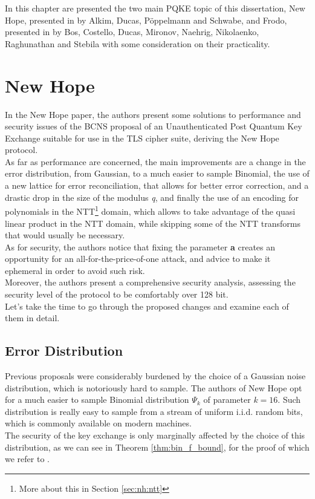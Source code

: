 In this chapter are presented the two main PQKE topic of this dissertation, New Hope, presented in \cite{newhope} by Alkim, Ducas, P{\"o}ppelmann and Schwabe, and Frodo, presented in \cite{frodo} by Bos, Costello, Ducas, Mironov, Naehrig, Nikolaenko, Raghunathan and Stebila with some consideration on their practicality.

\section{New Hope}
In the New Hope paper\cite{newhope}, the authors present some solutions to performance and security issues of the BCNS proposal \cite{BCNS} of an Unauthenticated Post Quantum Key Exchange suitable for use in the TLS cipher suite, deriving the New Hope protocol. \\
As far as performance are concerned, the main improvements are a change in the error distribution, from Gaussian, to a much easier to sample Binomial, the use of a new lattice for error reconciliation, that allows for better error correction, and a drastic drop in the size of the modulus \textit{q}, and finally the use of an encoding for polynomials in the NTT\footnote{More about this in Section \ref{sec:nh:ntt}} domain, which allows to take advantage of the quasi linear product in the NTT domain, while skipping some of the NTT transforms that would usually be necessary.\\
As for security, the authors notice that fixing the parameter \textbf{a} creates an opportunity for an all-for-the-price-of-one attack, and advice to make it ephemeral in order to avoid such risk.\\
Moreover, the authors present a comprehensive security analysis, assessing the security level of the protocol to be comfortably over 128 bit.\\
Let's take the time to go through the proposed changes and examine each of them in detail.

\subsection{Error Distribution}
Previous proposals were considerably burdened by the choice of a Gaussian noise distribution, which is notoriously hard to sample. The authors of New Hope opt for a much easier to sample Binomial distribution $\Psi_k$ of parameter $k=16$. Such distribution is really easy to sample from a stream of uniform i.i.d. random bits, which is commonly available on modern machines. \\
The security of the key exchange is only marginally affected by the choice of this distribution, as we can see in Theorem \ref{thm:bin_f_bound}, for the proof of which we refer to \cite{newhope}.

